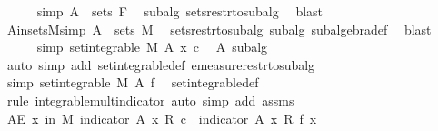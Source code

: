 \begin{isabellebody}
\ \ \ \ \isamarkupfalse%
\ {\isacharbrackleft}{\kern0pt}simp{\isacharbrackright}{\kern0pt}{\isacharcolon}{\kern0pt}\ {\isachardoublequoteopen}A\ {\isasymin}\ sets\ F{\isachardoublequoteclose}\ \isamarkupfalse%
\ subalg\ sets{\isacharunderscore}{\kern0pt}restr{\isacharunderscore}{\kern0pt}to{\isacharunderscore}{\kern0pt}subalg\ \isamarkupfalse%
\ blast\isanewline
\ \ \ \ \isamarkupfalse%
\ A{\isacharunderscore}{\kern0pt}in{\isacharunderscore}{\kern0pt}sets{\isacharunderscore}{\kern0pt}M{\isacharbrackleft}{\kern0pt}simp{\isacharbrackright}{\kern0pt}{\isacharcolon}{\kern0pt}\ {\isachardoublequoteopen}A\ {\isasymin}\ sets\ M{\isachardoublequoteclose}\ \isamarkupfalse%
\ sets{\isacharunderscore}{\kern0pt}restr{\isacharunderscore}{\kern0pt}to{\isacharunderscore}{\kern0pt}subalg\ subalg\ subalgebra{\isacharunderscore}{\kern0pt}def\ \isamarkupfalse%
\ blast\isanewline
\ \ \ \ \isamarkupfalse%
\ {\isacharbrackleft}{\kern0pt}simp{\isacharbrackright}{\kern0pt}{\isacharcolon}{\kern0pt}\ {\isachardoublequoteopen}set{\isacharunderscore}{\kern0pt}integrable\ M\ A\ {\isacharparenleft}{\kern0pt}{\isasymlambda}x{\isachardot}{\kern0pt}\ c{\isacharparenright}{\kern0pt}{\isachardoublequoteclose}\ \isamarkupfalse%
\ A\ subalg\ \isamarkupfalse%
\ {\isacharparenleft}{\kern0pt}auto\ simp\ add{\isacharcolon}{\kern0pt}\ set{\isacharunderscore}{\kern0pt}integrable{\isacharunderscore}{\kern0pt}def\ emeasure{\isacharunderscore}{\kern0pt}restr{\isacharunderscore}{\kern0pt}to{\isacharunderscore}{\kern0pt}subalg{\isacharparenright}{\kern0pt}\ \isanewline
\ \ \ \ \isamarkupfalse%
\ {\isacharbrackleft}{\kern0pt}simp{\isacharbrackright}{\kern0pt}{\isacharcolon}{\kern0pt}\ {\isachardoublequoteopen}set{\isacharunderscore}{\kern0pt}integrable\ M\ A\ f{\isachardoublequoteclose}\ \isamarkupfalse%
\ set{\isacharunderscore}{\kern0pt}integrable{\isacharunderscore}{\kern0pt}def\ \isamarkupfalse%
\ {\isacharparenleft}{\kern0pt}rule\ integrable{\isacharunderscore}{\kern0pt}mult{\isacharunderscore}{\kern0pt}indicator{\isacharcomma}{\kern0pt}\ auto\ simp\ add{\isacharcolon}{\kern0pt}\ assms{\isacharparenleft}{\kern0pt}{}{\isacharparenright}{\kern0pt}{\isacharparenright}{\kern0pt}\isanewline
\ \ \ \ \isamarkupfalse%
\ {\isachardoublequoteopen}AE\ x\ in\ M{\isachardot}{\kern0pt}\ indicator\ A\ x\ {\isacharasterisk}{\kern0pt}\isactrlsub R\ c\ {\isacharequal}{\kern0pt}\ indicator\ A\ x\ {\isacharasterisk}{\kern0pt}\isactrlsub R\ f\ x{\isachardoublequoteclose}\isanewline

\end{isabellebody}
